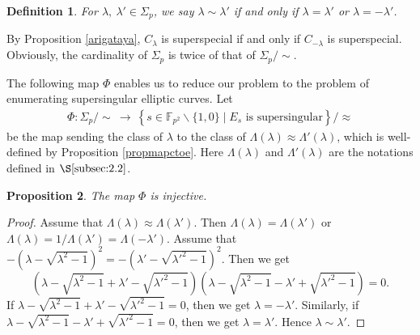 \documentclass[a4paper, 11pt]{article}
\newtheorem{defn}{Definition}[section]
\theoremstyle{plain}
\newtheorem{prop}[defn]{Proposition}
\newcommand{\?}{\textcolor{red}{??}}
\newcommand{\lm}{\lambda}
\newcommand{\llm}{{\lambda}'}
\newcommand{\Lm}{\Lambda}
\newcommand{\fpp}{\mathbb{F}_{p^2}}
\begin{document}
\begin{defn}
\label{eqrelationc}
     For $\lm,\ \llm \in {\Sigma}_p$, we say $\lm \sim \llm$ if and only if $\lm= \llm$ or $\lm=-\llm$.
\end{defn}
By Proposition \ref{arigataya}, $C_{\lm}$ is superspecial if and only if $C_{-\lm}$ is superspecial. 
Obviously, the cardinality of ${\Sigma}_p$ is twice of that of ${\Sigma}_p  / \sim$.

The following map $\Phi$ enables us to reduce our problem to
the problem of enumerating supersingular
elliptic curves. Let
\begin{eqnarray*}
 \Phi: {\Sigma}_{p}/\sim \ \longrightarrow \ \left\{ s \in \fpp \smallsetminus \{ 1,0\} \mid E_s \text{ is supersingular} \right\}/\approx 
\end{eqnarray*}
be the map sending the class of $\lm$ to the class of $\Lm(\lm) \approx {\Lm}'(\lm)$, which is well-defined by Proposition \ref{propmapctoe}. Here $\Lm(\lm)$ and $ {\Lm}'(\lm)$ are the notations defined in $\S \ref{subsec:2.2}$.
\begin{prop}
\label{injective}
    The map $\Phi$ is injective.
\end{prop}

\begin{proof}
   Assume that $\Lm(\lm) \approx \Lm(\llm)$. Then
 $\Lm(\lm)=\Lm(\llm)$ or $\Lm(\lm)=1/\Lm(\llm)=\Lm(-\llm)$. Assume that $-(\lambda-\sqrt{{\lambda}^2-1})^2=-(\llm-\sqrt{{\llm}^2-1})^2$. Then we get 
 \[
 (\lambda-\sqrt{{\lambda}^2-1}+\llm-\sqrt{{\llm}^2-1}) (\lambda-\sqrt{{\lambda}^2-1}-\llm+\sqrt{{\llm}^2-1})=0.
 \]
If $\lambda-\sqrt{{\lambda}^2-1}+\llm-\sqrt{{\llm}^2-1}=0$, then we get $\lm=-\llm$.
Similarly, if $\lambda-\sqrt{{\lambda}^2-1}-\llm+\sqrt{{\llm}^2-1}=0$, then we get $\lm=\llm$. 
Hence $\lm \sim \llm$.
\end{proof}

  
\end{document}
